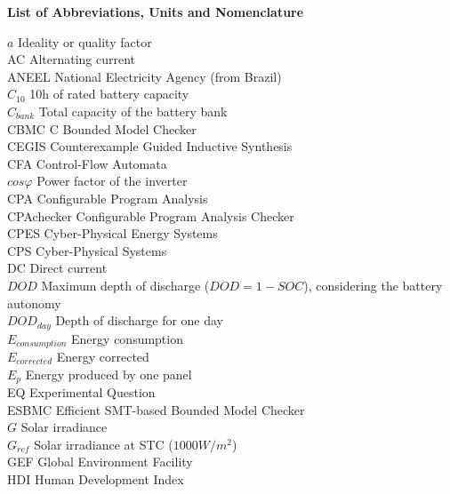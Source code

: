 \thispagestyle{plain}
\begin{center}
%    
%    
%    
    \vspace{0.9cm}
    \textbf{List of Abbreviations, Units and Nomenclature}
\end{center}

\noindent $a$ Ideality or quality factor \\
AC Alternating current \\
ANEEL National Electricity Agency (from Brazil) \\
$C_{10}$ 10h of rated battery capacity \\
$C_{bank}$ Total capacity of the battery bank \\
CBMC C Bounded Model Checker \\
CEGIS Counterexample Guided Inductive Synthesis \\
CFA Control-Flow Automata \\
$ cos \varphi $ Power factor of the inverter \\
CPA Configurable Program Analysis \\
CPAchecker Configurable Program Analysis Checker \\
CPES Cyber-Physical Energy Systems \\
CPS Cyber-Physical Systems \\
DC Direct current \\
$DOD$ Maximum depth of discharge ($DOD=1-SOC$), considering the battery autonomy \\
$DOD_{day}$ Depth of discharge for one day \\
$E_{consumption}$ Energy consumption \\
$E_{corrected}$ Energy corrected \\
$E_{p}$ Energy produced by one panel \\
EQ Experimental Question \\
ESBMC Efficient SMT-based Bounded Model Checker \\
$G$ Solar irradiance \\
$ G_{ref} $ Solar irradiance at STC ($1000 W/m^{2}$) \\
GEF Global Environment Facility \\
HDI Human Development Index \\
